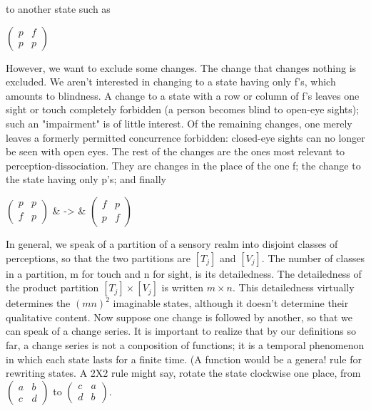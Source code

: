 \documentclass[10pt,twoside]{memoir}
\begin{document}
\begin{enumerate}
{\begin{enumerate}
to another state such as

$\begin{pmatrix}
	p & f \\
	p & p
\end{pmatrix}$

However, 
we want to exclude some changes. The change that changes nothing is 
excluded. We aren't interested in changing to a state having only f's, which 
amounts to blindness. A change to a state with a row or column of f's leaves 
one sight or touch completely forbidden (a person becomes blind to 
open-eye sights); such an "impairment" is of little interest. Of the remaining 
changes, one merely leaves a formerly permitted concurrence forbidden: 
closed-eye sights can no longer be seen with open eyes. The rest of the 
changes are the ones most relevant to perception-dissociation. They are 
changes in the place of the one f; the change to the state having only p's; 
and finally 


\begin{tabular}
	$\begin{pmatrix}
		p & p \\
		f & p
	\end{pmatrix}$ &
	->
	&
	$\begin{pmatrix}
		f & p \\
		p & f
	\end{pmatrix}$ \\
\end{tabular}

In general, we speak of a partition of a sensory realm into disjoint 
classes of perceptions, so that the two partitions are $[T_j]$ and $[V_j]$. The 
number of classes in a partition, m for touch and n for sight, is its 
detailedness. The detailedness of the product partition $[T_j]\times [V_j]$ is written 
$m\times n$. This detailedness virtually determines the $(mn)^2$ imaginable states, 
although it doesn't determine their qualitative content. Now suppose one 
change is followed by another, so that we can speak of a change series. It is 
important to realize that by our definitions so far, a change series is not a 
conposition of functions; it is a temporal phenomenon in which each state 
lasts for a finite time. (A function would be a genera! rule for rewriting 
states. A 2X2 rule might say, rotate the state clockwise one place, from
$\begin{pmatrix}a & b \\ c & d\end{pmatrix}$ to
$\begin{pmatrix}c & a \\ d & b\end{pmatrix}$.


\end{enumerate}}
\end{enumerate}
\end{document}
